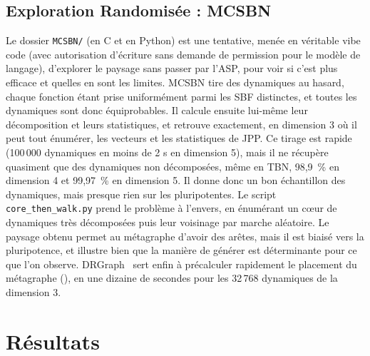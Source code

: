 \documentclass[12pt, a4paper]{article}
\begin{document}
\subsection{Exploration Randomisée : MCSBN}
\label{sec:mcsbn}

Le dossier \texttt{MCSBN/} (en C et en Python) est une tentative, menée en véritable vibe code (avec autorisation d'écriture sans demande de permission pour le modèle de langage), d'explorer le paysage sans passer par l'ASP, pour voir si c'est plus efficace et quelles en sont les limites.
MCSBN tire des dynamiques au hasard, chaque fonction étant prise uniformément parmi les SBF distinctes, et toutes les dynamiques sont donc équiprobables.
Il calcule ensuite lui-même leur décomposition et leurs statistiques, et retrouve exactement, en dimension 3 où il peut tout énumérer, les vecteurs et les statistiques de JPP.
Ce tirage est rapide (100\,000 dynamiques en moins de 2 s en dimension 5), mais il ne récupère quasiment que des dynamiques non décomposées, même en TBN, 98,9~\% en dimension 4 et 99,97~\% en dimension 5.
Il donne donc un bon échantillon des dynamiques, mais presque rien sur les pluripotentes.
Le script \texttt{core\_then\_walk.py} prend le problème à l'envers, en énumérant un cœur de dynamiques très décomposées puis leur voisinage par marche aléatoire.
Le paysage obtenu permet au métagraphe d'avoir des arêtes, mais il est biaisé vers la pluripotence, et illustre bien que la manière de générer est déterminante pour ce que l'on observe.
DRGraph~\cite{zhu2020} sert enfin à précalculer rapidement le placement du métagraphe (), en une dizaine de secondes pour les 32\,768 dynamiques de la dimension 3.

\section{Résultats}
\label{sec:observations}
\end{document}
